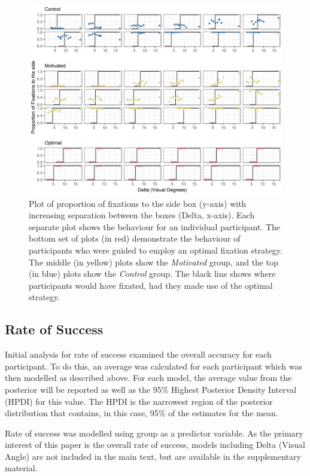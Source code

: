 \documentclass[vision,article,submit,moreauthors,pdftex,10pt,a4paper]{mdpi}
\begin{document}
\begin{figure}[H]
	\centering
	\includegraphics[width=16 cm]{../Figures/Part_2_all_groups.png}
	\caption{Plot of proportion of fixations to the side box (y-axis) with increasing separation between the boxes (Delta, x-axis). Each separate plot shows the behaviour for an individual participant. The bottom set of plots (in red) demonstrate the behaviour of participants who were guided to employ an optimal fixation strategy. The middle (in yellow) plots show the \textit{Motivated} group, and the top (in blue) plots show the \textit{Control} group. The black line shows where participants would have fixated, had they made use of the optimal strategy.
	}
	\label{fig:proportion}
\end{figure} 

\subsection{Rate of Success}
Initial analysis for rate of success examined the overall accuracy for each participant. To do this, an average was calculated for each participant which was then modelled as described above. For each model, the average value from the posterior will be reported as well as the 95\% Highest Posterior Density Interval (HPDI) for this value. The HPDI is the narrowest region of the posterior distribution that contains, in this case, 95\% of the estimates for the mean. 

Rate of success was modelled using group as a predictor variable. As the primary interest of this paper is the overall rate of success, models including Delta (Visual Angle) are not included in the main text, but are available in the supplementary material.
\end{document}
